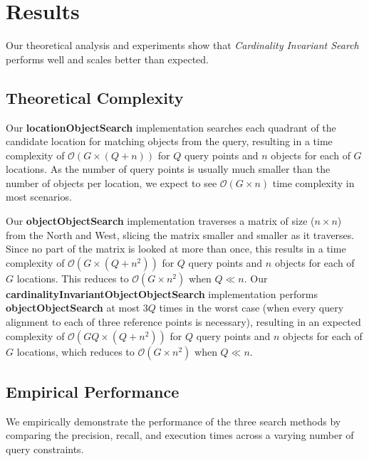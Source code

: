 \section{Results}
\label{section:results}

Our theoretical analysis and experiments show that \textit{Cardinality Invariant Search} performs well and scales better than expected.

\subsection{Theoretical Complexity}
Our \textbf{locationObjectSearch} implementation searches each quadrant of the candidate location for matching objects from the query, resulting in a time complexity of $\mathcal{O}(G \times (Q + n))$ for $Q$ query points and $n$ objects for each of $G$ locations. 
As the number of query points is usually much smaller than the number of objects per location, we expect to see $\mathcal{O}(G\times n)$ time complexity in most scenarios.

Our \textbf{objectObjectSearch} implementation traverses a matrix of size ($n \times n$) from the North and West, slicing the matrix smaller and smaller as it traverses. 
Since no part of the matrix is looked at more than once, this results in a time complexity of $\mathcal{O}(G \times (Q + n^2))$ for $Q$ query points and $n$ objects for each of $G$ locations. 
This reduces to $\mathcal{O}(G\times n^2)$ when $Q \ll n$. 
Our \textbf{cardinalityInvariantObjectObjectSearch} implementation performs \textbf{objectObjectSearch} at most $3Q$ times in the worst case (when every query alignment to each of three reference points is necessary), resulting in an expected complexity of $\mathcal{O}(GQ \times (Q + n^2))$ for $Q$ query points and $n$ objects for each of $G$ locations, which reduces to $\mathcal{O}(G \times n^2)$ when $Q \ll n$. 


\subsection{Empirical Performance}
We empirically demonstrate the performance of the three search methods by comparing the precision, recall, and execution times across a varying number of query constraints. 


